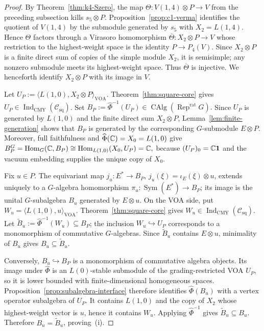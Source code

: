 \documentclass[10pt,a4paper]{amsart}
\numberwithin{equation}{section} \newtheorem{thm}{Theorem}[section] \newtheorem{lem}[thm]{Lemma} \newtheorem{ex}[thm]{Example} \newtheorem{prop}[thm]{Proposition} \newtheorem{cor}[thm]{Corollary} \newtheorem{defi}[thm]{Definition} \newtheorem{rmk}[thm]{Remark} \newtheorem{notation}[thm]{Notation}
\newcommand{\one}{\mathbf{1}}
\newcommand{\Rep}{\operatorname{Rep}}
\newcommand{\Sym}{\operatorname{Sym}}
\newcommand{\Hom}{\operatorname{Hom}}
\newcommand{\Csq}{\mathcal C_{\mathrm{sq}}}
\newcommand{\CAlg}{\operatorname{CAlg}}
\newcommand{\IndCMY}{\operatorname{Ind}_{\mathrm{CMY}}}
\begin{document}
\begin{proof}
By Theorem~\ref{thm:k4-Szero}, the map \(\Theta:V(1,4)\otimes P\to V\) from the preceding subsection kills $s_5\otimes P$. Proposition~\ref{prop:c1-verma} identifies the quotient of $V(1,4)$ by the submodule generated by $s_5$ with $X_2=L(1,4)$. Hence $\Theta$ factors through a Virasoro homomorphism \(\overline\Theta:X_2\otimes P\longrightarrow V\) whose restriction to the highest-weight space is the identity $P\to P_4(V)$. Since $X_2\otimes P$ is a finite direct sum of copies of the simple module $X_2$, it is semisimple; any nonzero submodule meets its highest-weight space. Thus $\overline\Theta$ is injective. We henceforth identify $X_2\otimes P$ with its image in $V$.

Let \(U_P:=\langle L(1,0),X_2\otimes P\rangle_{\mathrm{VOA}}.\) Theorem~\ref{thm:square-core} gives $U_P\in\IndCMY(\Csq)$. Set \(B_P:=\widehat\Phi^{-1}(U_P)\in\CAlg(\Rep^{\mathrm{rat}}G).\) Since $U_P$ is generated by $L(1,0)$ and the finite direct sum $X_2\otimes P$, Lemma~\ref{lem:finite-generation} shows that $B_P$ is generated by the corresponding $G$-submodule $E\otimes P$. Moreover, full faithfulness and $\widehat\Phi(\mathbb{C})=X_0=L(1,0)$ give \(B_P^G=\Hom_G(\C,B_P) \cong \Hom_{L(1,0)}(X_0,U_P)=\C,\) because $(U_P)_0=\C\one$ and the vacuum embedding supplies the unique copy of $X_0$.

Fix $u\in P$. The equivariant map \(j_u:E^*\to B_P\), \(j_u(\xi)=\iota_E(\xi)\otimes u\), extends uniquely to a $G$-algebra homomorphism \(\pi_u:\Sym(E^*)\to B_P\); its image is the unital $G$-subalgebra $B_u$ generated by $E\otimes u$. On the VOA side, put \(W_u=\langle L(1,0),u\rangle_{\mathrm{VOA}}.\) Theorem~\ref{thm:square-core} gives $W_u\in\IndCMY(\Csq)$. Let \(\widetilde B_u:=\widehat\Phi^{-1}(W_u)\subseteq B_P\); the inclusion $W_u\hookrightarrow U_P$ corresponds to a monomorphism of commutative $G$-algebras. Since $\widetilde B_u$ contains $E\otimes u$, minimality of $B_u$ gives $B_u\subseteq\widetilde B_u$.

Conversely, $B_u\hookrightarrow B_P$ is a monomorphism of commutative algebra objects. Its image under $\widehat\Phi$ is an $L(0)$-stable submodule of the grading-restricted VOA $U_P$, so it is lower bounded with finite-dimensional homogeneous spaces. Proposition~\ref{prop:subalgebra-interface} therefore identifies $\widehat\Phi(B_u)$ with a vertex operator subalgebra of $U_P$. It contains $L(1,0)$ and the copy of $X_2$ whose highest-weight vector is $u$, hence it contains $W_u$. Applying $\widehat\Phi^{-1}$ gives $\widetilde B_u\subseteq B_u$. Therefore $B_u=\widetilde B_u$, proving~(i).


\end{proof}
\end{document}
